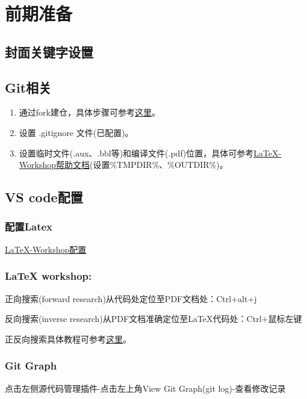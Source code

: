 \documentclass[internationalmaster]{hquThesis}
\begin{document}
\makecover
% 
% 

\frontmatter{
    
    \tableofcontents
}

\mainmatter
\chapter{前期准备}
\section{封面关键字设置}
\section{Git相关}
\begin{enumerate}
    \item 通过fork建仓，具体步骤可参考\href{https://docs.github.com/en/repositories/creating-and-managing-repositories/creating-a-template-repository}{这里}。
    \item 设置 .gitignore 文件(已配置)。
\item 设置临时文件(.aux、.bbl等)和编译文件(.pdf)位置，具体可参考\href{https://github.com/James-Yu/LaTeX-Workshop/wiki/Compile#latex-tools}{LaTeX-Workshop帮助文档}(设置\%TMPDIR\%、\%OUTDIR\%)。
\end{enumerate}

\section{VS code配置}
\subsection*{配置Latex}
\href{https://github.com/James-Yu/LaTeX-Workshop/wiki/Compile#latex-tools}{LaTeX-Workshop配置}
\subsection*{LaTeX workshop: }

正向搜索(forward research)从代码处定位至PDF文档处：Ctrl+alt+j

反向搜索(inverse research)从PDF文档准确定位至LaTeX代码处：Ctrl+鼠标左键

正反向搜索具体教程可参考\href{https://github.com/James-Yu/LaTeX-Workshop/wiki/View#synctex}{这里}。
\subsection*{Git Graph}
点击左侧源代码管理插件-点击左上角View Git Graph(git log)-查看修改记录
\end{document}
